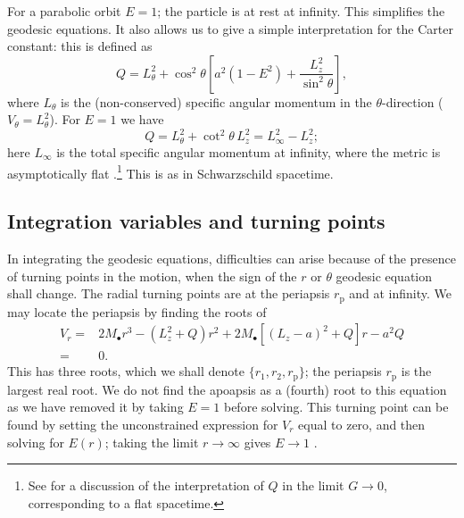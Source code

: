 \documentclass[useAMS,usedcolumn,usegraphicx,usenatbib]{mn2e}
\newcommand{\sub}[1]{\ensuremath{_\mathrm{#1}}}
\begin{document}
For a parabolic orbit $E = 1$; the particle is at rest at infinity. This simplifies the geodesic equations. It also allows us to give a simple interpretation for the Carter constant: this is defined as
\begin{equation}
Q = L_\theta^2 + \cos^2\theta\left[a^2\left(1 - E^2\right) + \frac{L_z^2}{\sin^2\theta}\right],
\end{equation}
where $L_\theta$ is the (non-conserved) specific angular momentum in the $\theta$-direction ($V_\theta = L_\theta^2$). For $E = 1$ we have
\begin{equation}
Q = L_\theta^2 + \cot^2\theta\, L_z^2 = L_\infty^2 - L_z^2;
\end{equation}
here $L_\infty$ is the total specific angular momentum at infinity, where the metric is asymptotically flat \citep{DeFelice1980}.\footnote{See \citet*{Rosquist2009} for a discussion of the interpretation of $Q$ in the limit $G \rightarrow 0$, corresponding to a flat spacetime.} This is as in Schwarzschild spacetime.

\subsection{Integration variables and turning points}

In integrating the geodesic equations, difficulties can arise because of the presence of turning points in the motion, when the sign of the $r$ or $\theta$ geodesic equation shall change. The radial turning points are at the periapsis $r\sub{p}$ and at infinity. We may locate the periapsis by finding the roots of
\begin{align}
V_r = {} & 2M_\bullet r^3 - \left(L_z^2+Q\right)r^2 + 2M_\bullet\left[\left(L_z - a\right)^2 + Q\right]r - a^2 Q \nonumber \\
 = {} & 0.
\end{align}
This has three roots, which we shall denote $\{r_1, r_2, r\sub{p}\}$; the periapsis $r\sub{p}$ is the largest real root. We do not find the apoapsis as a (fourth) root to this equation as we have removed it by taking $E = 1$ before solving. This turning point can be found by setting the unconstrained expression for $V_r$ equal to zero, and then solving for $E(r)$; taking the limit $r \rightarrow \infty$ gives $E \rightarrow 1$ \citep{Wilkins1972}.
\end{document}
